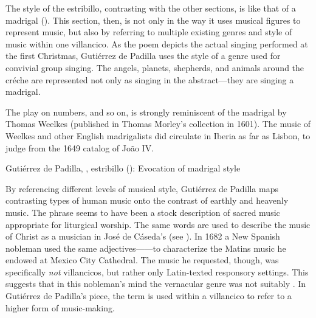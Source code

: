 The style of the estribillo, contrasting with the other sections, is like that
of a madrigal ().
This section, then, is  not only in the way it uses
musical figures to represent music, but also by referring to multiple existing
genres and style of music within one villancico.
As the poem depicts the actual singing performed at the first Christmas,
Gutiérrez de Padilla uses the style of a genre used for convivial group singing.
The angels, planets, shepherds, and animals around the créche are represented
not only as singing in the abstract---they are singing a madrigal.%
\begin{Footnote}
    The play on numbers,  and so on, is strongly
    reminiscent of the madrigal  by Thomas Weelkes (published in Thomas Morley's collection
     in 1601).
    The music of Weelkes and other English madrigalists did circulate in Iberia
    as far as Lisbon, to judge from the 1649 catalog of João IV.
\end{Footnote}


{Gutiérrez de Padilla, , estribillo
(): Evocation of madrigal style}

By referencing different levels of musical style, Gutiérrez de Padilla maps
contrasting types of human music onto the contrast of earthly and heavenly
music.
The phrase  seems to have been a stock description
of sacred music appropriate for liturgical worship.%
    \Autocite
    [On  and other common vocabulary used for music in Spanish
    poetry, see][]{UribeBracho:OrfeoPhD}
The same words are used to describe the music of Christ as a musician in José
de Cáseda's  (see ).
In 1682 a New Spanish nobleman used the same adjectives------to characterize the Matins music he endowed at Mexico City
Cathedral.%
    \Autocite[140--141]{Goldman:Responsory}
The music he requested, though, was specifically \emph{not} villancicos, but
rather only Latin-texted responsory settings.
This suggests that in this nobleman's mind the vernacular genre was not suitably
.
In Gutiérrez de Padilla's piece, the term is used within a villancico to
refer to a higher form of music-making. 


